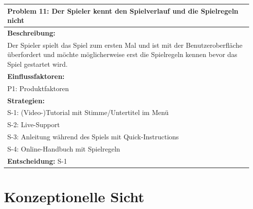 \documentclass[fontsize=12pt,paper=a4,twoside]{scrartcl}
\begin{document}
\begin{longtable}{|p{15cm}|}
\hline
Problem 11: Der Spieler kennt den Spielverlauf und die Spielregeln nicht                                                                     
\\ \hline                                                                                                                                                                                                                                                                                                                                                                                                                                                                                                                                                        
\textbf{Beschreibung:} \\
Der Spieler spielt das Spiel zum ersten Mal und ist mit der Benutzeroberfläche überfordert und möchte möglicherweise erst die Spielregeln kennen bevor das Spiel gestartet wird.
\\ \hline
\textbf{Einflussfaktoren:} \\
P1: Produktfaktoren
\\ \hline
\textbf{Strategien:} \\
S-1: (Video-)Tutorial mit Stimme/Untertitel im Menü \\
S-2: Live-Support \\
S-3: Anleitung während des Spiels mit Quick-Instructions \\
S-4: Online-Handbuch mit Spielregeln
 \\ \hline
 \textbf{Entscheidung:} S-1
\\ \hline
\end{longtable}

\section{Konzeptionelle Sicht} \label{sec:konzeptionell}
\end{document}
